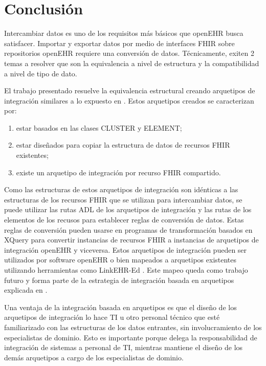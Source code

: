 \section{Conclusión}

Intercambiar datos es uno de los requisitos más básicos que openEHR busca satisfacer. Importar y exportar datos por medio de interfaces FHIR sobre repositorios openEHR requiere una conversión de datos. Técnicamente, exiten 2 temas a resolver que son la equivalencia a nivel de estructura y la compatibilidad a nivel de tipo de dato.

El trabajo presentado resuelve la equivalencia estructural creando arquetipos de integración similares a lo expuesto en \cite{openEHRArchitecture}. Estos arquetipos creados se caracterizan por:

\begin{enumerate}
  \item estar basados en las clases CLUSTER y ELEMENT;
  \item estar diseñados para copiar la estructura de datos de recursos FHIR existentes;
  \item existe un arquetipo de integración por recurso FHIR compartido.
\end{enumerate}

Como las estructuras de estos arquetipos de integración son idénticas a las estructuras de los recursos FHIR que se utilizan para intercambiar datos, se puede utilizar las rutas ADL de los arquetipos de integración y las rutas de los elementos de los recusos para establecer reglas de conversión de datos. Estas reglas de conversión pueden usarse en programas de transformación basados en XQuery para convertir instancias de recursos FHIR a instancias de arquetipos de integración openEHR y viceversa. Estos arquetipos de integración pueden ser utilizados por software openEHR o bien mapeados a arquetipos existentes utilizando herramientas como LinkEHR-Ed \cite{Maldonado09}. Este mapeo queda como trabajo futuro y forma parte de la estrategia de integración basada en arquetipos explicada en \cite{openEHRIntegration}.

Una ventaja de la integración basada en arquetipos es que el diseño de los arquetipos de integración lo hace TI u otro personal técnico que esté familiarizado con las estructuras de los datos entrantes, sin involucramiento de los especialistas de dominio. Esto es importante porque delega la responsabilidad de integración de sistemas a personal de TI, mientras mantiene el diseño de los demás arquetipos a cargo de los especialistas de dominio.

